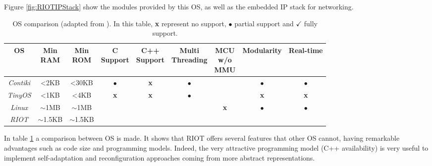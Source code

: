 Figure \ref{fig:RIOTIPStack} show the modules provided by this OS, as well as the embedded IP stack for networking.

\begin{table}[htb]
	\scriptsize
	\centering
	\caption{OS comparison (adapted from  \cite{baccelli2013riot}). In this table, \textbf{x} represent no support, $\bullet$ partial support and $\checkmark$ fully support.}
	\label{tab:OSComparison}
	\begin{tabular}{|c|cccccccc}
		\hline
		\textbf{OS} & 
		\multicolumn{1}{p{0.8cm}|}{\textbf{Min} \newline \textbf{RAM}} &
		\multicolumn{1}{p{0.8cm}|}{\textbf{Min} \newline \textbf{ROM}} &
		\multicolumn{1}{p{1.3cm}|}{\textbf{C} \newline \textbf{Support}} &
		\multicolumn{1}{p{1.3cm}|}{\textbf{C++} \newline \textbf{Support}} &
		\multicolumn{1}{p{1.6cm}|}{\textbf{Multi} \newline \textbf{Threading}} &
		\multicolumn{1}{p{1cm}|}{\textbf{MCU} \newline \textbf{w/o} \newline \textbf{MMU}} &
		\multicolumn{1}{c|}{\textbf{Modularity}} &
		\multicolumn{1}{c|}{\textbf{Real-time}} \\ \hline
		\textit{Contiki} & \textless 2KB & \textless 30KB &$\bullet$ & \textbf{x}       & $\bullet$     & \checkmark     &$\bullet$ &    $\bullet$ \\ \cline{1-1}
		\textit{TinyOS}  & \textless 1KB & \textless 4KB  &\textbf{x}& \textbf{x}       & $\bullet$     & \checkmark     &\textbf{x}&   \textbf{x}\\ \cline{1-1}
		\textit{Linux}   & $\mathtt{\sim}$1MB &$\mathtt{\sim}$1MB&\checkmark & \checkmark       &  \checkmark   & \textbf{x} &$\bullet$   &$\bullet$    \\ \cline{1-1}
		\textit{RIOT} & $\mathtt{\sim}$1.5KB & $\mathtt{\sim}$1.5KB & \checkmark    & \checkmark       & \checkmark & \checkmark & \checkmark & \checkmark  \\ \cline{1-1}
	\end{tabular}
\end{table}

In table \ref{tab:OSComparison} a comparison between OS is made.
It shows that RIOT offers several features that other OS cannot, having remarkable advantages such as code size and programming models.
Indeed, the very attractive programming model (C++ availability) is very useful to implement self-adaptation and reconfiguration approaches coming from more abstract representations.

